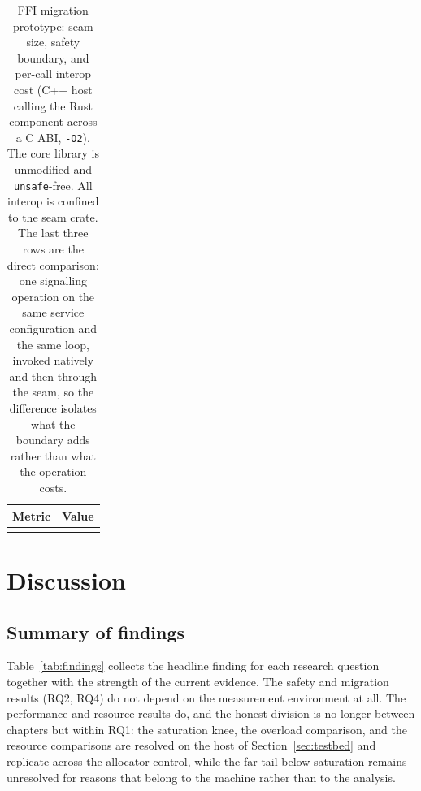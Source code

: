 \documentclass[english,twoside,openright,a4paper,censored,csm,software-track-2020]{HYthesisML}
\begin{document}
\begin{table}[H]
\centering
\caption[FFI migration prototype: seam size, safety, and cost]{FFI migration prototype: seam size, safety boundary, and per-call interop cost
(C++ host calling the Rust component across a C ABI, \texttt{-O2}). The core library is
unmodified and \texttt{unsafe}-free. All interop is confined to the seam crate. The last
three rows are the direct comparison: one signalling operation on the same service
configuration and the same loop, invoked natively and then through the seam, so the
difference isolates what the boundary adds rather than what the operation
costs.\label{tab:ffi}}
\begin{tabular}{l r}
\hline\hline
Metric & Value \\
\hline
\\
\hline
\end{tabular}
\end{table}

\chapter{Discussion\label{chapter:discussion}}

\section{Summary of findings}
Table~\ref{tab:findings} collects the headline finding for each research question together with the
strength of the current evidence. The safety and migration results (RQ2, RQ4) do not depend on the
measurement environment at all. The performance and resource results do, and the honest division
is no longer between chapters but within RQ1: the saturation knee, the overload comparison, and the
resource comparisons are resolved on the host of Section~\ref{sec:testbed} and replicate across the
allocator control, while the far tail below saturation remains unresolved for reasons that belong
to the machine rather than to the analysis.
\end{document}
